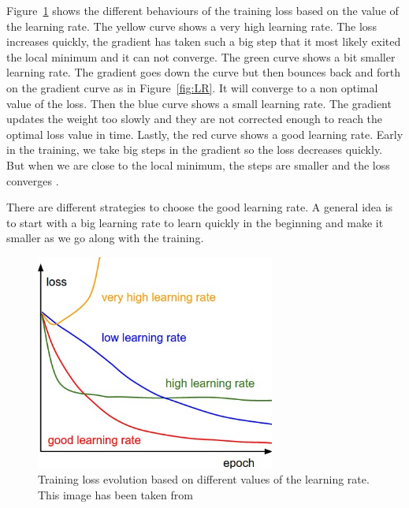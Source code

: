 Figure~\ref{fig:LR_impact} shows the different behaviours of the training loss based on the value of the learning rate. The yellow curve shows a very high learning rate. The loss increases quickly, the gradient has taken such a big step that it most likely exited the local minimum and it can not converge. The green curve shows a bit smaller learning rate. The gradient goes down the curve but then bounces back and forth on the gradient curve as in Figure~\ref{fig:LR}. It will converge to a non optimal value of the loss. Then the blue curve shows a small learning rate. The gradient updates the weight too slowly and they are not corrected enough to reach the optimal loss value in time. Lastly, the red curve shows a good learning rate. Early in the training, we take big steps in the gradient so the loss decreases quickly. But when we are close to the local minimum, the steps are smaller and the loss converges \cite{lr}. 

There are different strategies to choose the good learning rate. A general idea is to start with a big learning rate to learn quickly in the beginning and make it smaller as we go along with the training. 
\begin{figure}[!htp]
    \centering
        \includegraphics[width=0.7\textwidth]{figures/02-LR_impatc_train}
        \caption[Impact of the learning rate on training]{Training loss evolution based on different values of the learning rate. This image has been taken from \cite{cs231n}}\label{fig:LR_impact}
\end{figure}

